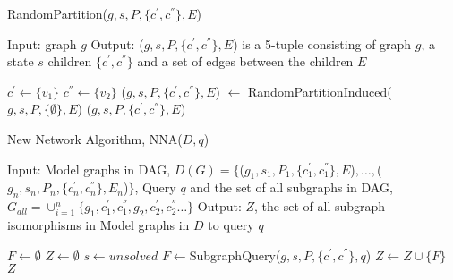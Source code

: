 \begin{algorithm}
\caption{RandomPartition($g,s,P,\{c^{'},c^{''}\},E$)}
\label{alg:alg04}
\begin{algorithmic}
\STATE Input: graph $g$
\STATE Output: ($g,s,P,\{c^{'},c^{''}\},E$) is a 5-tuple consisting of graph $g$, a state $s$ children $\{c^{'},c^{''}\}$  and a set of edges between the children $E$ 
\end{algorithmic}
\begin{algorithmic}[1]
    \STATE   $c^{'} \leftarrow \{v_1 \}$
    \STATE   $c^{''} \leftarrow \{v_2 \}$    
 \ELSE
   \STATE ($g,s,P,\{c^{'},c^{''}\},E$) $\leftarrow$ RandomPartitionInduced($g,s,P,\{\emptyset \},E$)
\ENDIF
\RETURN ($g,s,P,\{c^{'},c^{''}\},E$)
\end{algorithmic}
\end{algorithm}


\begin{algorithm}
\caption{New Network Algorithm, NNA($D , q$)}
\label{alg:alg05}
\begin{algorithmic}
\STATE Input: Model graphs in DAG, $D(G)= \{$($g_1 ,s_1 ,P_1 ,\{c^{'}_1 ,c^{''}_1 \},E$)$,\ldots,$($g_n,s_n,P_n,\{c_n^{'},c_n^{''}\},E_n$)$ \}$, Query $q$
\STATE and the set of all subgraphs in DAG, $G_{all} = \cup_{i=1}^n \{g_1 ,c_1^{'},c_1^{''},g_2 ,c_2^{'},c_2^{''}\ldots \}$ 
\STATE Output: $Z$, the set of all subgraph isomorphisms in Model graphs in $D$ to query $q$ 
\end{algorithmic}
\begin{algorithmic}[1]
\STATE $F \leftarrow \emptyset$
\STATE $Z \leftarrow \emptyset$
  \STATE  $s \leftarrow unsolved$
\ENDFOR
{}
   \STATE $F \leftarrow $SubgraphQuery($g,s,P,\{c^{'},c^{''}\},q$)
      \STATE $Z \leftarrow Z \cup \{F\}$
   \ENDIF
\ENDFOR
\RETURN $Z$
\end{algorithmic}
\end{algorithm}


